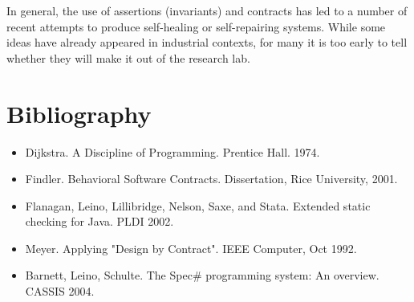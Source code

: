 \documentclass[11pt]{article}
\begin{document}
In general, the use of assertions (invariants) and contracts has led to a
number of recent attempts to produce self-healing or self-repairing
systems. While some ideas have already appeared in industrial contexts, for many
it is too early to tell whether they will make it out of the research lab.

\section{Bibliography}

\begin{itemize}
\item Dijkstra. A Discipline of Programming. Prentice Hall. 1974.

\item Findler. Behavioral Software Contracts. Dissertation, Rice University,
2001. 

\item Flanagan, Leino, Lillibridge, Nelson, Saxe, and Stata.
 Extended static checking for Java. PLDI 2002.


\item Meyer. Applying "Design by Contract". IEEE Computer, Oct 1992.

\item 
Barnett, Leino, Schulte. 
The Spec\# programming system: An overview. CASSIS 2004.
 
\end{itemize}
\end{document}
